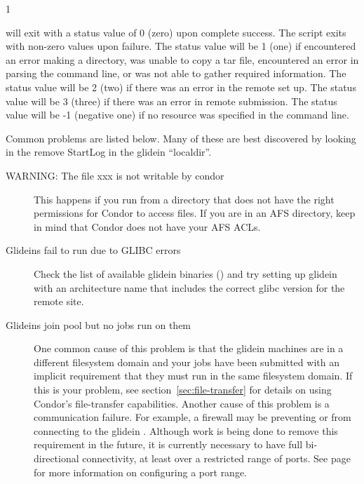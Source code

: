 \begin{ManPage}{\label{man-condor-glidein}}{1}
\begin{Options}
\end{Options}

\ExitStatus

 will exit with a status value of 0 (zero) upon 
complete success.
The script exits with non-zero values upon failure.
The status value will be 1 (one) if 
 encountered an error making a directory,
was unable to copy a tar file,
encountered an error in parsing the command line,
or was not able to gather required information.
The status value will be 2 (two) if 
there was an error in the remote set up.
The status value will be 3 (three) if 
there was an error in remote submission.
The status value will be -1 (negative one) if 
no resource was specified in the command line.

Common problems are listed below.  Many of these are best discovered by
looking in the remove StartLog in the glidein ``localdir''.

\begin{description}

\item[WARNING: The file xxx is not writable by condor]  This happens if you
run  from a directory that does not have the right
permissions for Condor to access files.  If you are in an AFS directory,
keep in mind that Condor does not have your AFS ACLs.

\item[Glideins fail to run due to GLIBC errors] Check the list of
available glidein binaries
() and try setting
up glidein with an architecture name that includes the correct glibc
version for the remote site.

\item[Glideins join pool but no jobs run on them] One common
cause of this problem is that the glidein machines are in a different
filesystem domain and your jobs have been submitted with an implicit
requirement that they must run in the same filesystem domain.  If this
is your problem, see section~\ref{sec:file-transfer} for details on
using Condor's file-transfer capabilities.  Another cause of this
problem is a communication failure.  For example, a firewall may be
preventing  or  from connecting to
the glidein .  Although work is being done to remove
this requirement in the future, it is currently necessary to have full
bi-directional connectivity, at least over a restricted range of
ports.  See page~\pageref{param:HighPort} for more information on
configuring a port range.


\end{description}
\end{ManPage}
